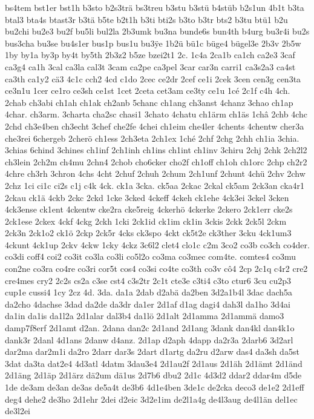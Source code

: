 {bs4tem
bst1er
bst1h
b3sto
b2s3trä
bs3treu
b3stu
b3stü
b4stüb
b2s1un
4b1t
b3ta
btal3
bta4s
btast3r
b3tä
b5te
b2t1h
b3ti
bti2s
b3to
b3tr
bts2
b3tu
btü1
b2u
bu2chi
bu2e3
bu2f
bu5li
bul2la
2b3umk
bu3na
bunde6s
bun4th
b4urg
bu3r4i
bu2s
bus3cha
bu3se
bu4s1er
bus1p
bus1u
bu3^^ffe
1b2ü
bü1c
büge4
bügel3e
2b3v
2b5w
1by
by1a
by3p
by4t
by5th
2b3z2
b5ze
bzei2t1
2c.
1c4a
2ca1b
ca1ch
ca2e3
3caf
ca3g4
ca1h
3cal
ca3la
cal3t
3cam
ca2pe
ca3pel
3car
car3n
carri1
ca3s2a3
ca4st
ca3th
ca1y2
cä3
4c1c
cch2
4cd
c1do
2cec
ce2dr
2cef
ce1i
2cek
3cen
cen3g
cen3ta
ce3n1u
1cer
ce1ro
ce3sh
ce1st
1cet
2ceta
cet3am
ce3ty
ce1u
1cé
2c1f
c4h
4ch.
2chab
ch3abi
ch1ah
ch1ak
ch2anb
5chanc
ch1ang
ch3anst
4chanz
3chao
ch1ap
4char.
ch3arm.
3charta
cha2sc
chasi1
3chato
4chatu
ch1ärm
ch1äs
1châ
2chb
4chc
2chd
ch3e4ben
ch3echt
3chef
che2fe
4chei
ch1eim
che4ler
4chents
4chentw
cher3a
che3rei
6chergeb
2cherö
ch1ess
2ch3eta
2ch1ex
1ché
2chf
2chg
2chh
ch1ia
3chia.
3chias
6chind
3chines
ch1inf
2ch1inh
ch1ins
ch1int
ch1inv
3chiru
2chj
2chk
2ch2l2
ch3lein
2ch2m
ch4mu
2chn4
2chob
cho6cker
cho2f
ch1off
ch1oh
ch1orc
2chp
ch2r2
4chre
ch3rh
3chron
4chs
4cht
2chuf
2chuh
2chum
2ch1unf
2chunt
4chü
2chv
2chw
2chz
1ci
ci1c
ci2s
c1j
c4k
4ck.
ck1a
3cka.
ck5aa
2ckac
2ckal
ck5am
2ck3an
cka4r1
2ckau
ck1ä
4ckb
2ckc
2ckd
1cke
3cked
4ckeff
4ckeh
ck1ehe
4ck3ei
3ckel
3cken
4ck3ense
ck1ent
4ckentw
cke2ra
cke5reig
4ckerhö
4ckerke
2ckero
2ck1err
cke2s
2ck1ese
2ckex
4ckf
4ckg
2ckh
1cki
2ck1id
ck1im
ck1in
3ckis
2ckk
2ck5l
2ckm
2ck3n
2ck1o2
ck1ö
2ckp
2ck5r
4cks
ck3spo
4ckt
ck5t2e
ck3ther
3cku
4ck1um3
4ckunt
4ck1up
2ckv
4ckw
1cky
4ckz
3c6l2
clet4
clo1c
c2m
3co2
co3b
co3ch
co4der.
co3di
coff4
coi2
co3it
co3la
co3li
co5l2o
co3ma
co3mec
com4te.
comtes4
co3mu
con2ne
co3ra
co4re
co3ri
cor5t
cos4
co3si
co4te
co3th
co3v
cô4
2cp
2c1q
c4r2
cre2
cre4mes
cry2
2c2s
cs2a
c3se
cst4
c3s2tr
2c1t
cte3e
c3ti4
c3to
ctur6
3cu
cu2p3
cup1e
cussi4
1cy
2cz
4d.
3da.
da1a
2dab
d2abä
da2ben
3d2a1b4l
3dac
dach5a
da2cho
4dachse
3dad
da2de
da3dr
da1er
2d1af
d1ag
dagi4
dah3l
da1ho
3d4ai
da1in
da1is
da1l2a
2d1alar
dal3b4
da1lö
2d1alt
2d1amma
2d1ammä
damo3
damp7f8erf
2d1amt
d2an.
2dana
dan2c
2d1and
2d1ang
3dank
dan4kl
dan4k1o
dank3r
2danl
4d1ans
2danw
d4anz.
2d1ap
d2aph
4dapp
da2r3a
2darb6
3d2arl
dar2ma
dar2m1i
da2ro
2darr
dar3s
2dart
d1artg
da2ru
d2arw
das4
da3sh
da5st
3dat
da3ta
dat2e4
4d3atl
4datm
3dau3e4
2d1au2f
2d1aus
2d1äh
2d1ämt
2d1änd
2d1äng
2d1äp
2d1ärz
dä2um
dä1us
2d7b6
dbu2
2d1c
4d3d2
ddar2
ddar4m
d5de
1de
de3am
de3an
de3as
de5a4t
de3b6
4d1e4ben
3de1c
de2cka
deco3
de1e2
2d1eff
deg4
dehe2
de3ho
2d1ehr
2dei
d2eic
3d2e1im
de2l1a4g
de4l3aug
de4l1än
del1ec
de3l2ei
}
